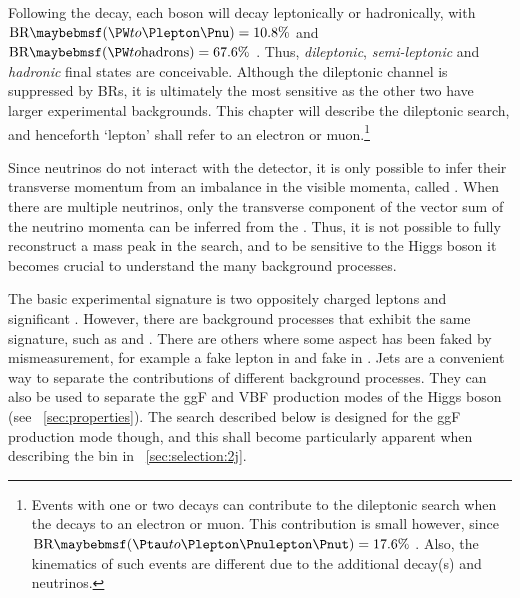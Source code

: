 
Following the \HWW decay, each \PW boson will decay leptonically or hadronically, with 
$\text{BR}\parenths{\HepProcess{\PW\HepTo\Plepton\Pnu}} = 10.8\%$ and 
$\text{BR}\parenths{\HepProcess{\PW\HepTo \text{hadrons}}} = 67.6\%$ \cite{PDG:2012}. 
Thus, \textit{dileptonic}, \textit{semi-leptonic} and \textit{hadronic} final states are 
conceivable. Although the dileptonic channel is suppressed by \acp{BR}, it is ultimately 
the most sensitive as the other two have larger experimental backgrounds. This chapter 
will describe the dileptonic search, and henceforth 
`lepton' shall refer to an electron or muon.\footnote{
	Events with one or two \HepProcess{\PW\HepTo\Ptau\Pnu} decays can 
	contribute to the dileptonic search when the \Ptau decays to an electron or muon. This 
	contribution is small however, since
	$\text{BR}\parenths{\HepProcess{\Ptau\HepTo\Plepton\Pnulepton\Pnut}} = 17.6\%$ 
	\cite{PDG:2012}. Also, the kinematics of such events are different due to the 
	additional decay(s) and neutrinos.
}

Since neutrinos do not interact with the detector, it is only possible to infer their 
transverse momentum from an imbalance in the visible momenta, called \met. When there are 
multiple neutrinos, only the transverse component of the vector sum of the neutrino 
momenta can be inferred from the \met. Thus, it is not possible to fully reconstruct a 
mass peak in the \HWWlvlv search, and to be sensitive to the Higgs boson it becomes 
crucial to understand the many background processes.

The basic experimental signature is two oppositely charged leptons and significant \met. 
However, there are background processes that exhibit the same signature, such as \WW and 
\ttbar. There are others where some aspect has been faked by mismeasurement, for example a 
fake lepton in \Wjets and fake \met in \Zjets. Jets are a convenient way to separate the 
contributions of different background processes. They can also be used to separate the 
\ac{ggF} and \ac{VBF} production modes of the Higgs boson (see 
\Section~\ref{sec:properties}). The search described below is designed for the \ac{ggF} 
production mode though, and this shall become particularly apparent when describing the 
\twojet bin in \Section~\ref{sec:selection:2j}.

